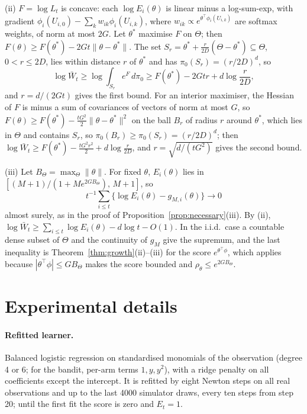 \documentclass[12pt]{article}
\theoremstyle{remark}
\begin{document}
(ii) $F = \log L_t$ is concave: each $\log E_i(\theta)$ is linear minus a
log-sum-exp, with gradient $\phi_i(U_{i,0}) - \sum_k w_{ik}\phi_i(U_{i,k})$, where
$w_{ik} \propto e^{\theta^\top\phi_i(U_{i,k})}$ are softmax weights, of norm at
most $2G$. Let $\theta^*$ maximise $F$ on $\Theta$; then
$F(\theta) \ge F(\theta^*) - 2Gt\|\theta - \theta^*\|$. The set
$S_r = \theta^* + \frac{r}{2D}(\Theta - \theta^*) \subseteq \Theta$, $0 < r \le 2D$,
lies within distance $r$ of $\theta^*$ and has $\pi_0(S_r) = (r/2D)^d$, so
\[
\log \bar W_t \ge \log\int_{S_r} e^{F}\, d\pi_0 \ge F(\theta^*) - 2Gtr + d \log\frac{r}{2D},
\]
and $r = d/(2Gt)$ gives the first bound. For an interior maximiser, the
Hessian of $F$ is minus a sum of covariances of vectors of norm at most $G$, so
$F(\theta) \ge F(\theta^*) - \frac{tG^2}{2}\|\theta-\theta^*\|^2$ on the ball $B_r$
of radius $r$ around $\theta^*$, which lies in $\Theta$ and contains $S_r$, so
$\pi_0(B_r) \ge \pi_0(S_r) = (r/2D)^d$; then
$\log \bar W_t \ge F(\theta^*) - \frac{tG^2 r^2}{2} + d\log\frac{r}{2D}$, and
$r = \sqrt{d/(tG^2)}$ gives the second bound.

(iii) Let $B_\Theta = \max_\Theta\|\theta\|$. For fixed $\theta$, $E_i(\theta)$
lies in $[(M+1)/(1 + M e^{2GB_\Theta}),\, M+1]$, so
\[
t^{-1}\textstyle\sum_{i\le t}\{\log E_i(\theta) - g_{M,i}(\theta)\} \to 0
\]
almost surely, as in the proof of
Proposition~\ref{prop:necessary}(iii). By (ii),
$\log \bar W_t \ge \sum_{i \le t} \log E_i(\theta) - d\log t - O(1)$. In the
i.i.d.\ case a countable dense subset of $\Theta$ and the continuity of $g_M$
give the supremum, and the last inequality is Theorem~\ref{thm:growth}(ii)--(iii)
for the score $e^{\theta^\top\phi}$, which applies because
$|\theta^\top\phi| \le GB_\Theta$ makes the score bounded and
$\rho_\theta \le e^{2GB_\Theta}$.

\section{Experimental details}\label{app:details}

\paragraph{Refitted learner.} Balanced logistic regression on standardised
monomials of the observation (degree 4 or 6; for the bandit, per-arm terms
$1, y, y^2$), with a ridge penalty on all coefficients except the intercept.
It is refitted by eight Newton steps on all real observations and up to the
last 4000 simulator draws, every ten steps from step 20; until the first fit
the score is zero and $E_t = 1$.
\end{document}
